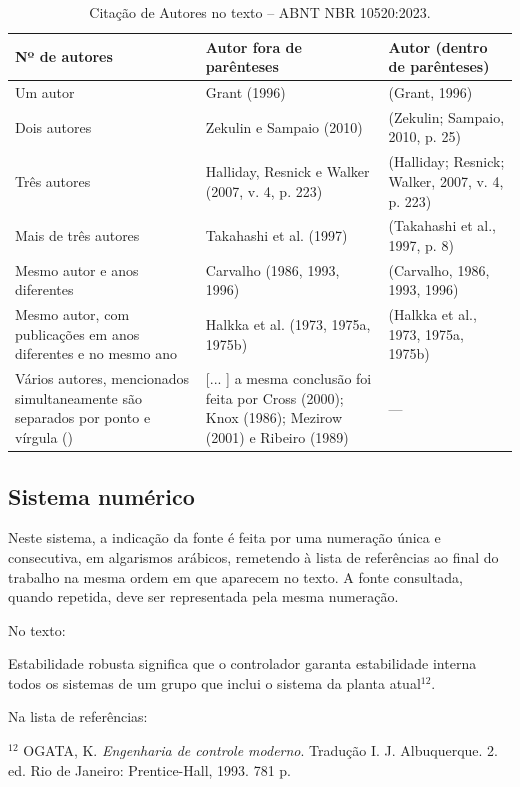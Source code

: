 \begin{table}[H]
  \centering
  \caption{Citação de Autores no texto -- ABNT NBR 10520:2023.}
  \label{tab:citacao-autores-nbr10520-2023}
  \begin{tabular}{p{}p{}p{}}
    \toprule
    \textbf{Nº de autores} & \textbf{Autor fora de parênteses} & \textbf{Autor (dentro de parênteses)} \\
    \midrule
    Um autor & Grant (1996) & (Grant, 1996) \\
    Dois autores & Zekulin e Sampaio (2010) & (Zekulin; Sampaio, 2010, p. 25) \\
    Três autores & Halliday, Resnick e Walker (2007, v. 4, p. 223) & (Halliday; Resnick; Walker, 2007, v. 4, p. 223) \\
    Mais de três autores & Takahashi et al. (1997) & (Takahashi et al., 1997, p. 8) \\
    Mesmo autor e anos diferentes & Carvalho (1986, 1993, 1996) & (Carvalho, 1986, 1993, 1996) \\
    Mesmo autor, com publicações em anos diferentes e no mesmo ano & Halkka et al. (1973, 1975a, 1975b) & (Halkka et al., 1973, 1975a, 1975b) \\
    Vários autores, mencionados simultaneamente são separados por ponto e vírgula (\;) & [... ] a mesma conclusão foi feita por Cross (2000); Knox (1986); Mezirow (2001) e Ribeiro (1989) & --- \\
    \bottomrule
  \end{tabular}
\end{table}

\subsection{Sistema numérico}

Neste sistema, a indicação da fonte é feita por uma numeração única e consecutiva, em algarismos arábicos, remetendo à lista de referências ao final do trabalho na mesma ordem em que aparecem no texto. A fonte consultada, quando repetida, deve ser representada pela mesma numeração.

No texto:

Estabilidade robusta significa que o controlador garanta estabilidade interna todos os sistemas de um grupo que inclui o sistema da planta atual$^{12}$.

Na lista de referências:

$^{12}$ OGATA, K. \textit{Engenharia de controle moderno}. Tradução I. J. Albuquerque. 2. ed. Rio de Janeiro: Prentice-Hall, 1993. 781 p.

